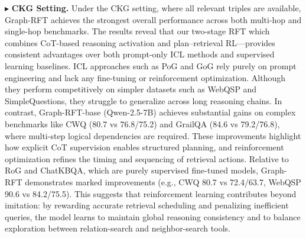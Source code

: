 \documentclass[sigconf]{acmart}
\begin{document}
\noindent  $\blacktriangleright$ \textbf{CKG Setting.} Under the CKG setting, where all relevant triples are available, Graph-RFT achieves the strongest overall performance across both multi-hop and single-hop benchmarks. The results reveal that our two-stage RFT which combines CoT-based reasoning activation and plan–retrieval RL—provides consistent advantages over both prompt-only ICL methods and supervised learning baselines.
ICL approaches such as PoG and GoG rely purely on prompt engineering and lack any fine-tuning or reinforcement optimization. Although they perform competitively on simpler datasets such as WebQSP and SimpleQuestions, they struggle to generalize across long reasoning chains. In contrast, Graph-RFT-base (Qwen-2.5-7B) achieves substantial gains on complex benchmarks like CWQ (80.7 vs 76.8/75.2) and GrailQA (84.6 vs 79.2/76.8), where multi-step logical dependencies are required. These improvements highlight how explicit CoT supervision enables structured planning, and reinforcement optimization refines the timing and sequencing of retrieval actions.
Relative to RoG and ChatKBQA, which are purely supervised fine-tuned models, Graph-RFT demonstrates marked improvements (e.g., CWQ 80.7 vs 72.4/63.7, WebQSP 90.6 vs 84.2/75.5). This suggests that reinforcement learning contributes beyond imitation: by rewarding accurate retrieval scheduling and penalizing inefficient queries, the model learns to maintain global reasoning consistency and to balance exploration between relation-search and neighbor-search tools.
\end{document}
